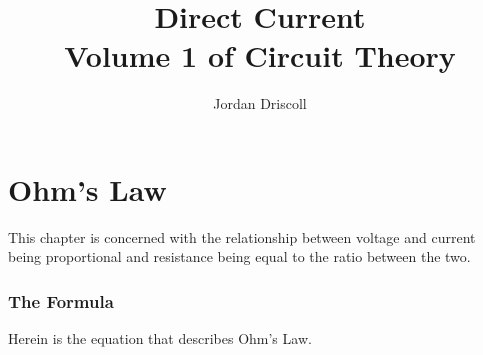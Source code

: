 \documentclass{article}
\begin{document}
	\title{Direct Current \\ Volume 1 of Circuit Theory}
	\author{Jordan Driscoll}
	\maketitle
	\part[Ch.1]{Ohm's Law}
	This chapter is concerned with the relationship between voltage and current 
	being proportional and resistance being equal to the ratio between the two.
	\section[Ohm's Law]{The Formula}
	Herein is the equation that describes Ohm's Law.
\end{document}
